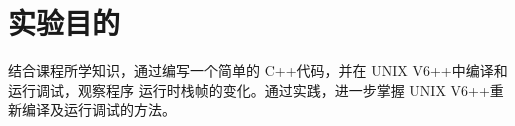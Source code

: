 \section{实验目的}
结合课程所学知识，通过编写一个简单的 C++代码，并在 UNIX V6++中编译和运行调试，观察程序
运行时栈帧的变化。通过实践，进一步掌握 UNIX V6++重新编译及运行调试的方法。 
